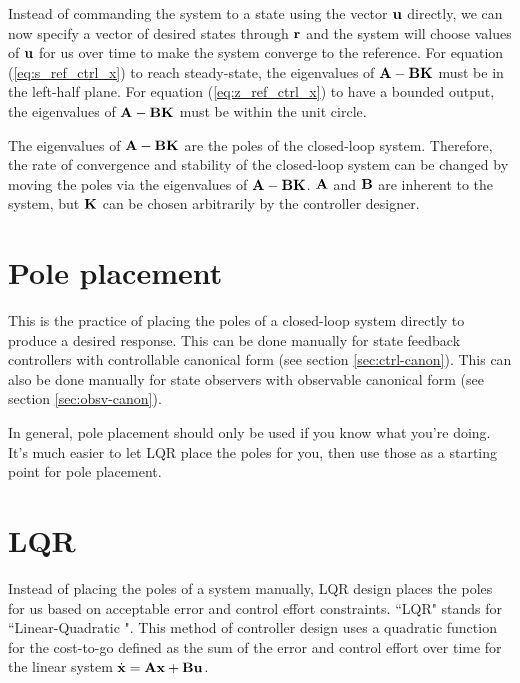 Instead of commanding the system to a state using the vector $\mathbf{u}$ directly,
we can now specify a vector of desired states through $\mathbf{r}$ and the system
will choose values of $\mathbf{u}$ for us over time to make the system converge to
the reference. For equation (\ref{eq:s_ref_ctrl_x}) to reach steady-state, the
eigenvalues of $\mathbf{A} - \mathbf{B}\mathbf{K}$ must be in the left-half plane. For
equation (\ref{eq:z_ref_ctrl_x}) to have a bounded output, the eigenvalues of
$\mathbf{A} - \mathbf{B}\mathbf{K}$ must be within the unit circle.

The eigenvalues of $\mathbf{A} - \mathbf{B}\mathbf{K}$ are the poles of the closed-loop
system. Therefore, the rate of convergence and stability of the closed-loop
system can be changed by moving the poles via the eigenvalues of
$\mathbf{A} - \mathbf{B}\mathbf{K}$. $\mathbf{A}$ and $\mathbf{B}$ are inherent to the system,
but $\mathbf{K}$ can be chosen arbitrarily by the controller designer.

\section{Pole placement}

This is the practice of placing the poles of a closed-loop system directly to
produce a desired response. This can be done manually for state feedback
controllers with controllable canonical form (see section \ref{sec:ctrl-canon}).
This can also be done manually for state observers with observable canonical
form (see section \ref{sec:obsv-canon}).

In general, pole placement should only be used if you know what you're doing.
It's much easier to let LQR place the poles for you, then use those as a
starting point for pole placement.

\section{LQR} \label{sec:lqr}

Instead of placing the poles of a system manually, LQR design places the poles
for us based on acceptable error and control effort constraints. ``LQR" stands
for ``Linear-Quadratic ". This method of
controller design uses a quadratic function for the cost-to-go defined as the
sum of the error and control effort over time for the linear system
$\dot{\mathbf{x}} = \mathbf{A}\mathbf{x} + \mathbf{B}\mathbf{u}$.

